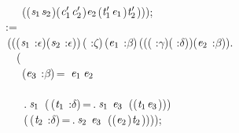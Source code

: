 \,\,\,\,\,\,\,\,\,\,\\
\,\,\,\,\,\,\,\,\,\,\,\,((\ensuremath{\HOLBoundVar{s}\sb{\mathrm{1}}}\HOLSymConst{,}\ensuremath{\HOLBoundVar{s}\sb{\mathrm{2}}})\HOLSymConst{,}(\ensuremath{\HOLBoundVar{c}\sb{\mathrm{1}}\sp{\prime{}}}\HOLSymConst{,}\ensuremath{\HOLBoundVar{c}\sb{\mathrm{2}}\sp{\prime{}}})\HOLSymConst{,}\ensuremath{\HOLBoundVar{e}\sb{\mathrm{2}}}\HOLSymConst{,}(\ensuremath{\HOLBoundVar{t}\sb{\mathrm{1}}\sp{\prime{}}}\HOLSymConst{,}\ensuremath{\HOLBoundVar{e}\sb{\mathrm{1}}})\HOLSymConst{,}\ensuremath{\HOLBoundVar{t}\sb{\mathrm{2}}\sp{\prime{}}})));\\
\,\,\,:=\\
\,\,\,\,(\HOLTokenLambda{}((\ensuremath{\HOLBoundVar{s}\sb{\mathrm{1}}} :\ensuremath{\epsilon})\HOLSymConst{,}(\ensuremath{\HOLBoundVar{s}\sb{\mathrm{2}}} :\ensuremath{\epsilon}))\,( :\ensuremath{\zeta})\,(\ensuremath{\HOLBoundVar{e}\sb{\mathrm{1}}} :\ensuremath{\beta})\,((( :\ensuremath{\gamma})\HOLSymConst{,}( :\ensuremath{\delta}))\HOLSymConst{,}(\ensuremath{\HOLBoundVar{e}\sb{\mathrm{2}}} :\ensuremath{\beta})).\\
\,\,\,\,\,\,\,\,\,(\\
\,\,\,\,\,\,\,\,\,\,\,\,(\ensuremath{\HOLBoundVar{e}\sb{\mathrm{3}}} :\ensuremath{\beta})\,=\,\,\,\ensuremath{\HOLBoundVar{e}\sb{\mathrm{1}}}\,\ensuremath{\HOLBoundVar{e}\sb{\mathrm{2}}}\\
\,\,\,\,\,\,\,\,\,\,\\
\,\,\,\,\,\,\,\,\,\,\,\,\,.\,\ensuremath{\HOLBoundVar{s}\sb{\mathrm{1}}}\,\,\,(\,(\ensuremath{\HOLBoundVar{t}\sb{\mathrm{1}}} :\ensuremath{\delta})\,=\,.\,\ensuremath{\HOLBoundVar{s}\sb{\mathrm{1}}}\,\,\ensuremath{\HOLBoundVar{e}\sb{\mathrm{3}}}\,\,\,((\ensuremath{\HOLBoundVar{t}\sb{\mathrm{1}}}\HOLSymConst{,}\ensuremath{\HOLBoundVar{e}\sb{\mathrm{3}}})\HOLSymConst{,}))\\
\,\,\,\,\,\,\,\,\,\,\,\,\,(\,(\ensuremath{\HOLBoundVar{t}\sb{\mathrm{2}}} :\ensuremath{\delta})\,=\,.\,\ensuremath{\HOLBoundVar{s}\sb{\mathrm{2}}}\,\,\ensuremath{\HOLBoundVar{e}\sb{\mathrm{3}}}\,\,\,((\HOLSymConst{,}\ensuremath{\HOLBoundVar{e}\sb{\mathrm{2}}})\HOLSymConst{,}\ensuremath{\HOLBoundVar{t}\sb{\mathrm{2}}}))));\\
